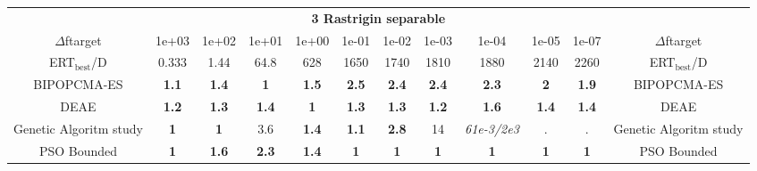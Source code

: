 \begin{tabular}{cccccccccccc}
 & \multicolumn{10}{c}{{\normalsize \textbf{3 Rastrigin separable}}}\\
$\Delta$ftarget& 1e+03& 1e+02& 1e+01& 1e+00& 1e-01& 1e-02& 1e-03& 1e-04& 1e-05& 1e-07 & $\Delta$ftarget \\
ERT$_{\textrm{best}}$/D& 0.333& 1.44& 64.8& 628& 1650& 1740& 1810& 1880& 2140& 2260 & ERT$_{\textrm{best}}$/D \\
\hline
BIPOPCMA-ES & \textbf{1.1} & \textbf{1.4} & \textbf{1} & \textbf{1.5} & \textbf{2.5} & \textbf{2.4} & \textbf{2.4} & \textbf{2.3} & \textbf{2} & \textbf{1.9} & BIPOPCMA-ES \cite{add_an_entry_for_BIPOPCMA-ES_in_bbob.bib}\\
DEAE & \textbf{1.2} & \textbf{1.3} & \textbf{1.4} & \textbf{1} & \textbf{1.3} & \textbf{1.3} & \textbf{1.2} & \textbf{1.6} & \textbf{1.4} & \textbf{1.4} & DEAE \cite{add_an_entry_for_DEAE_in_bbob.bib}\\
Genetic Algoritm study & \textbf{1} & \textbf{1} & 3.6 & \textbf{1.4} & \textbf{1.1} & \textbf{2.8} & 14 & \textit{61e-3}\textit{/2e3} & . & . & Genetic Algoritm study \cite{add_an_entry_for_Genetic Algoritm study_in_bbob.bib}\\
PSO Bounded & \textbf{1} & \textbf{1.6} & \textbf{2.3} & \textbf{1.4} & \textbf{1} & \textbf{1} & \textbf{1} & \textbf{1} & \textbf{1} & \textbf{1} & PSO Bounded \cite{add_an_entry_for_PSO Bounded_in_bbob.bib}
\end{tabular}

